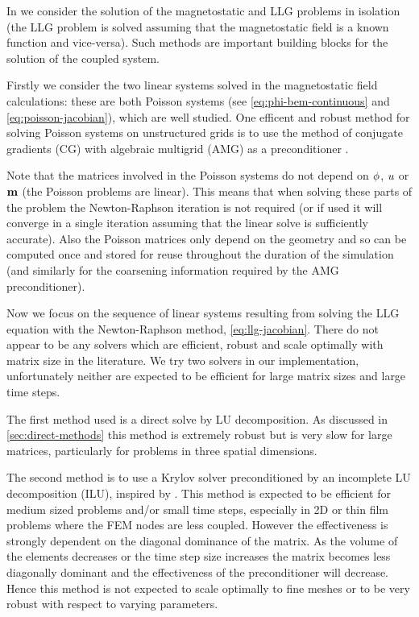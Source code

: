 In  we consider the solution of the magnetostatic and LLG problems in isolation (\ie the LLG problem is solved assuming that the magnetostatic field is a known function and vice-versa).
Such methods are important building blocks for the solution of the coupled system.

Firstly we consider the two linear systems solved in the magnetostatic field calculations: these are both Poisson systems (see \cref{eq:phi-bem-continuous} and \cref{eq:poisson-jacobian}), which are well studied.
One efficent and robust method for solving Poisson systems on unstructured grids is to use the method of conjugate gradients (CG) with algebraic multigrid (AMG) as a preconditioner \cite{Henson2002}.

Note that the matrices involved in the Poisson systems do not depend on $\phi$, $u$ or $\boldsymbol{\mathrm{m}}$ (\ie the Poisson problems are linear).
This means that when solving these parts of the problem the Newton-Raphson iteration is not required (or if used it will converge in a single iteration assuming that the linear solve is sufficiently accurate).
Also the Poisson matrices only depend on the geometry and so can be computed once and stored for reuse throughout the duration of the simulation (and similarly for the coarsening information required by the AMG preconditioner).


Now we focus on the sequence of linear systems resulting from solving the LLG equation with the Newton-Raphson method, \cref{eq:llg-jacobian}.
There do not appear to be any solvers which are efficient, robust and scale optimally with matrix size in the literature.
We try two solvers in our implementation, unfortunately neither are expected to be efficient for large matrix sizes and large time steps.

The first method used is a direct solve by LU decomposition.
As discussed in \cref{sec:direct-methods} this method is extremely robust but is very slow for large matrices, particularly for problems in three spatial dimensions.

The second method is to use a Krylov solver preconditioned by an incomplete LU decomposition (ILU), inspired by \cite{Suess2002}.
This method is expected to be efficient for medium sized problems and/or small time steps, especially in 2D or thin film problems where the FEM nodes are less coupled.
However the effectiveness is strongly dependent on the diagonal dominance of the matrix.
As the volume of the elements decreases or the time step size increases the matrix becomes less diagonally dominant and the effectiveness of the preconditioner will decrease.
Hence this method is not expected to scale optimally to fine meshes or to be very robust with respect to varying parameters.

